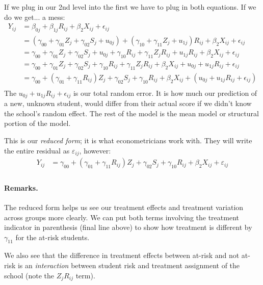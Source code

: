 \documentclass[
  letterpaper,
  DIV=11,
  numbers=noendperiod]{scrreprt}
\let\oldparagraph\paragraph
\renewcommand{\paragraph}[1]{\oldparagraph{#1}\mbox{}}
\begin{document}
If we plug in our 2nd level into the first we have to plug in both
equations. If we do we get... a mess: \[\begin{aligned}
Y_{ij} &= \beta_{0j} + \beta_{1j} R_{ij} + \beta_{2} X_{ij} + \epsilon_{ij} \\
&= (\gamma_{00} + \gamma_{01} Z_{j} + \gamma_{02} S_{j} + u_{0j}) + (\gamma_{10} + \gamma_{11} Z_{j} + u_{1j}) R_{ij} + \beta_{2} X_{ij} + \epsilon_{ij} \\
&= \gamma_{00} + \gamma_{01} Z_{j} + \gamma_{02} S_{j} + u_{0j} + \gamma_{10} R_{ij} + \gamma_{11} Z_{j} R_{ij} + u_{1j} R_{ij} + \beta_{2} X_{ij} + \epsilon_{ij} \\ 
&= \gamma_{00} + \gamma_{01} Z_{j} + \gamma_{02} S_{j} + \gamma_{10} R_{ij} + \gamma_{11} Z_{j} R_{ij} + \beta_{2} X_{ij} + u_{0j} +  u_{1j} R_{ij} + \epsilon_{ij} \\
&= \gamma_{00} + (\gamma_{01} + \gamma_{11} R_{ij} ) Z_{j}  + \gamma_{02} S_{j} + \gamma_{10} R_{ij} + \beta_{2} X_{ij} + (u_{0j} +  u_{1j} R_{ij} + \epsilon_{ij}) \\
\end{aligned}\] The \(u_{0j} + u_{1j} R_{ij} + \epsilon_{ij}\) is our
total random error. It is how much our prediction of a new, unknown
student, would differ from their actual score if we didn't know the
school's random effect. The rest of the model is the mean model or
structural portion of the model.

This is our \emph{reduced form}; it is what econometricians work with.
They will write the entire residual as \(\varepsilon_{ij}\), however:
\[\begin{aligned}
Y_{ij} &= \gamma_{00} + (\gamma_{01} + \gamma_{11} R_{ij} ) Z_{j}  + \gamma_{02} S_{j} + \gamma_{10} R_{ij} + \beta_{2} X_{ij} + \varepsilon_{ij} \\
\end{aligned}\]

\paragraph{Remarks.}\label{remarks.-3}

The reduced form helps us see our treatment effects and treatment
variation across groups more clearly. We can put both terms involving
the treatment indicator in parenthesis (final line above) to show how
treatment is different by \(\gamma_{11}\) for the at-risk students.

We also see that the difference in treatment effects between at-risk and
not at-risk is an \emph{interaction} between student risk and treatment
assignment of the school (note the \(Z_j R_{ij}\) term).
\end{document}
